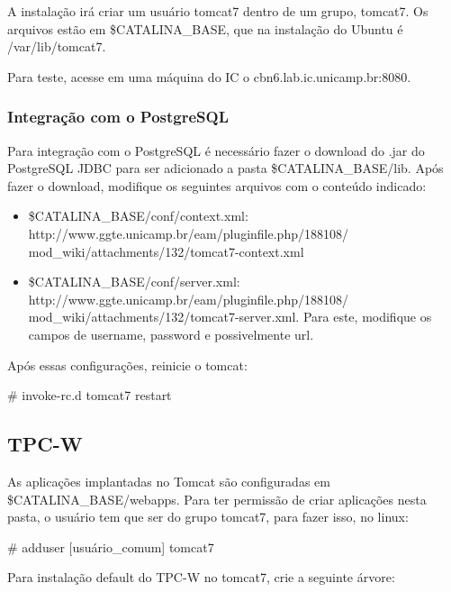 \documentclass[a4paper,10pt]{article}
\begin{document}
        A instalação irá criar um usuário tomcat7 dentro de um grupo, tomcat7. Os arquivos estão em \$CATALINA\_BASE, que na instalação do Ubuntu é /var/lib/tomcat7.

        Para teste, acesse em uma máquina do IC o cbn6.lab.ic.unicamp.br:8080.

        \subsubsection{Integração com o PostgreSQL}
        Para integração com o PostgreSQL é necessário fazer o download do .jar do PostgreSQL JDBC para ser adicionado a pasta \$CATALINA\_BASE/lib. Após fazer o download, modifique os seguintes arquivos com o conteúdo indicado:

        \begin{itemize}
        \setlength{\itemindent}{-.0in}
            \item \$CATALINA\_BASE/conf/context.xml: http://www.ggte.unicamp.br/eam/pluginfile.php/188108/
            mod\_wiki/attachments/132/tomcat7-context.xml
            \item \$CATALINA\_BASE/conf/server.xml: http://www.ggte.unicamp.br/eam/pluginfile.php/188108/
            mod\_wiki/attachments/132/tomcat7-server.xml. Para este, modifique os campos de username, password e possivelmente url.
        \end{itemize}

        Após essas configurações, reinicie o tomcat:

        \begin{spverbatim}
        # invoke-rc.d tomcat7 restart
        \end{spverbatim}

        \subsection{TPC-W}

        As aplicações implantadas no Tomcat são configuradas em \$CATALINA\_BASE/webapps. Para ter permissão de criar aplicações nesta pasta, o usuário tem que ser do grupo tomcat7, para fazer isso, no linux:

        \begin{spverbatim}
            # adduser [usuário_comum] tomcat7
        \end{spverbatim}

        Para instalação default do TPC-W no tomcat7, crie a seguinte árvore:
\end{document}
